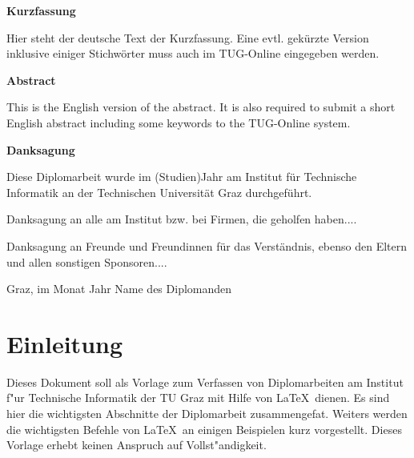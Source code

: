 \documentclass[11pt]{report}
\begin{document}


\newpage
\vspace*{2.2 cm}
{\Large
\noindent
{\bf Kurzfassung}} \\
\vspace*{0.3 cm}

\noindent
Hier steht der deutsche Text der Kurzfassung. Eine
evtl. gek\"{u}rzte Version inklusive einiger Stichw\"{o}rter muss auch im
TUG-Online eingegeben werden.


\newpage
{}
\vspace*{2.2 cm}
{\Large
\noindent
{\bf Abstract}} \\
\vspace*{0.3 cm}

\noindent
This is the English version of the abstract.  It is also
required to submit a short English abstract including some
keywords to the TUG-Online system.

\newpage
{}
\newpage
\vspace*{2.2 cm}
{\Large
\noindent
{\bf Danksagung}} \\
\vspace*{0.3 cm}

\noindent
Diese Diplomarbeit wurde im (Studien)Jahr am Institut f\"{u}r
Technische Informatik an der Technischen Universit\"{a}t Graz
durchgef\"{u}hrt.

\smallskip
Danksagung an alle am Institut bzw. bei Firmen, die geholfen
haben....

\medskip
Danksagung an Freunde und Freundinnen f\"{u}r das Verst\"{a}ndnis, ebenso
den Eltern und allen sonstigen Sponsoren....

\vspace{2 cm}

\noindent Graz, im Monat Jahr \hfill Name des Diplomanden

\newpage
\tableofcontents  

\listoffigures 

\listoftables

\pagestyle{headings}
\chapter{Einleitung}
\label{kap:Einleitung} 
Dieses Dokument soll als Vorlage zum Verfassen von Diplomarbeiten am
Institut f"ur Technische Informatik der TU Graz mit Hilfe von \LaTeX\
dienen.  Es sind hier die wichtigsten Abschnitte der Diplomarbeit 
zusammengefa\3t.  Weiters werden die wichtigsten Befehle von \LaTeX\ an
einigen Beispielen kurz vorgestellt.  Dieses Vorlage erhebt keinen Anspruch
auf Vollst"andigkeit.
\end{document}
